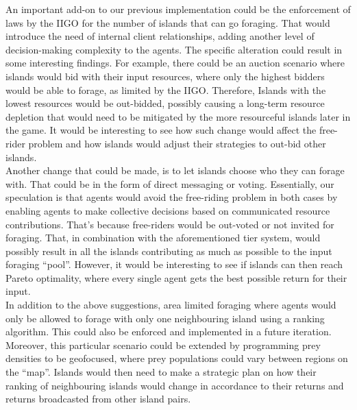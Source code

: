 An important add-on to our previous implementation could be the enforcement of laws by the IIGO for the number of islands that can go foraging. That would introduce the need of internal client relationships, adding another level of decision-making complexity to the agents. The specific alteration could result in some interesting findings. For example, there could be an auction scenario where islands would bid with their input resources, where only the highest bidders would be able to forage, as limited by the IIGO. Therefore, Islands with the lowest resources would be out-bidded, possibly causing a long-term resource depletion that would need to be mitigated by the more resourceful islands later in the game. It would be interesting to see how such change would affect the free-rider problem and how islands would adjust their strategies to out-bid other islands.\\

Another change that could be made, is to let islands choose who they can forage with. That could be in the form of direct messaging or voting. Essentially, our speculation is that agents would avoid the free-riding problem in both cases by enabling agents to make collective decisions based on communicated resource contributions. That’s because free-riders would be out-voted or not invited for foraging. That, in combination with the aforementioned tier system, would possibly result in all the islands contributing as much as possible to the input foraging “pool”.  However, it would be interesting to see if islands can then reach Pareto optimality, where every single agent gets the best possible return for their input.\\

In addition to the above suggestions, area limited foraging where agents would only be allowed to forage with only one neighbouring island using a ranking algorithm. This could also be enforced and implemented in a future iteration. Moreover, this particular scenario could be extended by programming prey densities to be geofocused, where prey populations could vary between regions on the “map”. Islands would then need to make a strategic plan on how their ranking of neighbouring islands would change in accordance to their returns and returns broadcasted from other island pairs.\\

